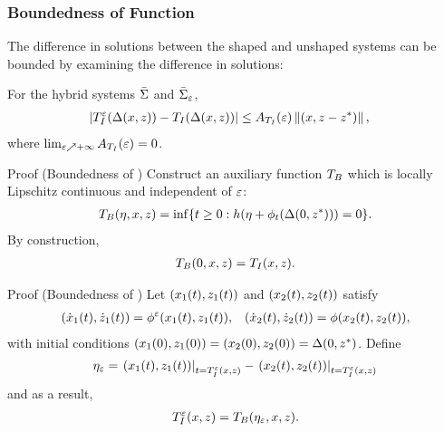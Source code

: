\begin{frame}[t]
  \frametitle{Boundedness of \TtI{} Function}
   {
    The difference in solutions between the shaped and unshaped systems can be
    bounded by examining the difference in solutions:
    \begin{lemma}
      For the hybrid systems $\bar{\Sigma}$ and $\bar{\Sigma}_{\varepsilon}$,
      \begin{eqnarray}
        \nonumber
        &| T_{I}^{\varepsilon}(\Delta(x, z)) - T_{I}(\Delta(x, z)) | \leq A_{T_{I}}(\varepsilon) \left\|(x, z - z^{*})\right\|,
      \end{eqnarray}
      where $\lim_{\varepsilon \nearrow +\infty} A_{T_{I}}(\varepsilon) = 0$.
    \end{lemma}
  }
  
   {
    \begin{block}{Proof (Boundedness of \TtI{})}
      Construct an auxiliary \tti{} function $T_{B}$ which is locally Lipschitz
      continuous and independent of $\varepsilon$:
      \begin{align*}
        T_{B}(\eta, x, z) = \inf\{t \geq 0 : h(\eta + \phi_{t}(\Delta(0,
        z^{*}))) = 0\}.
      \end{align*}
      By construction,
      \begin{align*}
        T_{B}(0, x, z) = T_{I}(x, z).
      \end{align*}
    \end{block}
  }

   {
    \begin{block}{Proof (Boundedness of \TtI{})}
      Let $(x_{1}(t), z_{1}(t))$ and $(x_{2}(t), z_{2}(t))$ satisfy\vspace{-.4em}
      \begin{align*}
        ({\dot {x}}_{1}(t), {\dot {z}}_{1}(t)) = \phi^{\varepsilon}(x_{1}(t), z_{1}(t)), && ({\dot {x}}_{2}(t), {\dot {z}}_{2}(t)) =
        \phi(x_{2}(t), z_{2}(t)),
      \end{align*}
      with initial conditions $(x_{1}(0), z_{1}(0)) = (x_{2}(0), z_{2}(0)) = \Delta(0,
      z^{*})$. Define
      \begin{align*}
        \eta_{\varepsilon} = \left.(x_{1}(t), z_{1}(t))\right|_{t = T_{I}^{\varepsilon}(x, z)} -
        \left.(x_{2}(t), z_{2}(t))\right|_{t = T_{I}^{\varepsilon}(x, z)}
      \end{align*}
      and as a result,\vspace{-.4em}
      \begin{align*}
        T_{I}^{\varepsilon}(x, z) = T_{B}(\eta_{\varepsilon}, x, z).
      \end{align*}
    \end{block}
  }


\end{frame}
